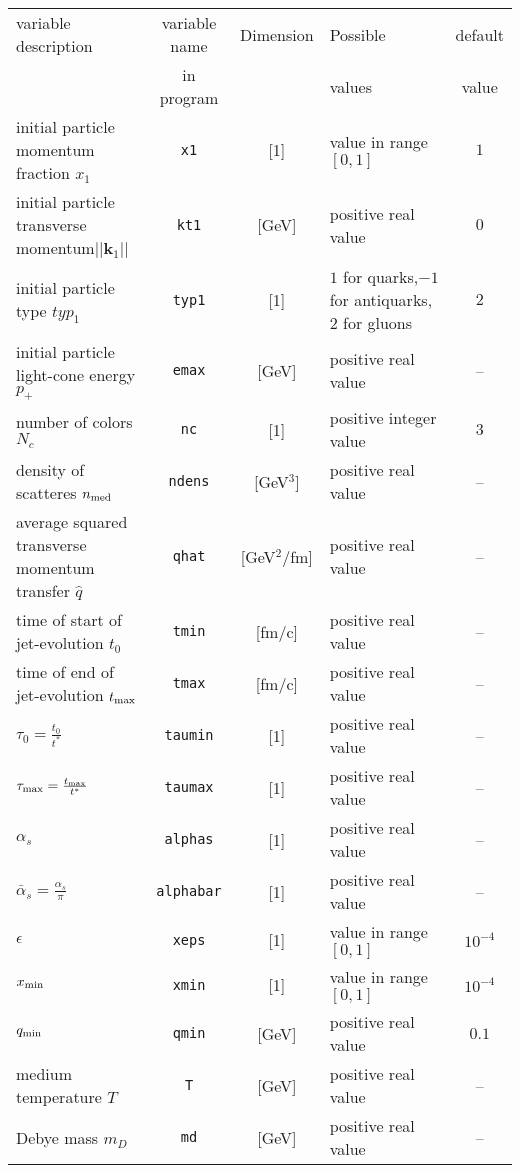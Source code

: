 \documentclass[preprint,12pt]{elsarticle}
\begin{document}
\begin{table}[h!]
    \centering
    \begin{tabular}{p{7.5cm}|c|c|p{3.8cm}|c}
         variable description& variable name&Dimension& Possible  &default \\
         & in program&&values&value\\\hline
         initial particle momentum fraction $x_1$&\verb#x1#&[1]&value in range $[0,1]$&$1$\\
         initial particle transverse momentum$||\mathbf{k}_1||$&\verb#kt1#&[GeV]&positive real value&$0$\\
         initial particle type $typ_1$&\verb#typ1#&[1]&$1$ for quarks,$-1$ for antiquarks, $2$ for gluons&$2$\\
         initial particle light-cone energy $p_+$ & \verb#emax#&[GeV]&positive real value&--\\ 
         number of colors $N_c$&\verb#nc#&[1]&positive integer value&$3$\\
         density of scatteres $n_{\rm med}$& \verb#ndens#& [GeV$^3$]&positive real value& --\\
         average squared transverse momentum transfer $\hat{q}$& \verb#qhat#&[GeV$^2$/fm]&positive real value&--\\
         time of start of jet-evolution $t_0$&\verb#tmin#&[fm/c]&positive real value&--\\
         time of end of jet-evolution $t_{\rm max}$&\verb#tmax#&[fm/c]&positive real value&--\\
         $\tau_0=\frac{t_0}{t^\ast}$&\verb#taumin#&[1]&positive real value&--\\
         $\tau_{\rm max}=\frac{t_{\rm max}}{t^\ast}$&\verb#taumax#&[1]&positive real value&--\\
         $\alpha_s$&\verb#alphas#&[1]&positive real value&--\\
         $\bar{\alpha}_s=\frac{\alpha_s}{\pi}$&\verb#alphabar#&[1]&positive real value&--\\
         $\epsilon$&\verb#xeps#&[1]&value in range $[0,1]$&$10^{-4}$\\
         $x_{\rm min}$&\verb#xmin#&[1]&value in range $[0,1]$&$10^{-4}$\\
         $q_{\rm min}$&\verb#qmin#&[GeV]&positive real value&$0.1$\\
         medium temperature $T$&\verb#T#&[GeV]&positive real value&--\\
         Debye mass $m_D$& \verb#md#&[GeV]&positive real value&--\\

\end{tabular}
\end{table}
\end{document}
